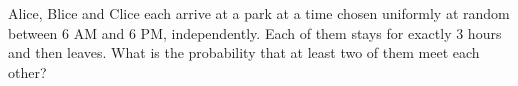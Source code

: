 Alice, Blice and Clice each arrive at a park at a time chosen uniformly at random between 6 AM and 6 PM, independently. Each of them stays for exactly $3$ hours and then leaves. What is the probability that at least two of them meet each other?
